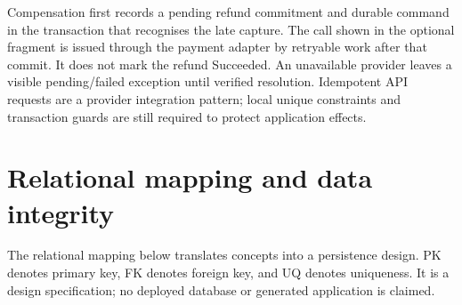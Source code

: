 Compensation first records a pending refund commitment and durable command in the transaction that recognises the late capture. The call shown in the optional fragment is issued through the payment adapter by retryable work after that commit. It does not mark the refund Succeeded. An unavailable provider leaves a visible pending/failed exception until verified resolution. Idempotent API requests are a provider integration pattern\cite{stripeidempotent}; local unique constraints and transaction guards are still required to protect application effects.

\section{Relational mapping and data integrity}
The relational mapping below translates concepts into a persistence design. PK denotes primary key, FK denotes foreign key, and UQ denotes uniqueness. It is a design specification; no deployed database or generated application is claimed.
